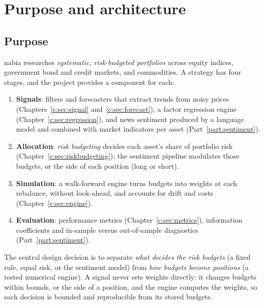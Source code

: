 
\chapter{Purpose and architecture}\label{ch:architecture}

\section{Purpose}
nabia researches \emph{systematic, risk-budgeted portfolios} across equity indices, government bond and credit
markets, and commodities. A strategy has four stages, and the project provides a component for each:
\begin{enumerate}
  \item \textbf{Signals}: filters and forecasters that extract trends from noisy prices (Chapters~\ref{c:sec:signal}
        and~\ref{c:sec:forecast}), a factor regression engine (Chapter~\ref{c:sec:regression}), and news sentiment
        produced by a language model and combined with market indicators per asset (Part~\ref{part:sentiment}).
  \item \textbf{Allocation}: \emph{risk budgeting} decides each asset's share of portfolio risk
        (Chapter~\ref{c:sec:riskbudgeting}); the sentiment pipeline modulates those budgets, or the side of each
        position (long or short).
  \item \textbf{Simulation}: a walk-forward engine turns budgets into weights at each rebalance, without
        look-ahead, and accounts for drift and costs (Chapter~\ref{c:sec:engine}).
  \item \textbf{Evaluation}: performance metrics (Chapter~\ref{c:sec:metrics}), information coefficients and
        in-sample versus out-of-sample diagnostics (Part~\ref{part:sentiment}).
\end{enumerate}
The central design decision is to separate \emph{what decides the risk budgets} (a fixed rule, equal risk, or
the sentiment model) from \emph{how budgets become positions} (a tested numerical engine). A signal never sets
weights directly: it changes budgets within bounds, or the side of a position, and the engine computes the
weights, so each decision is bounded and reproducible from its stored budgets.

